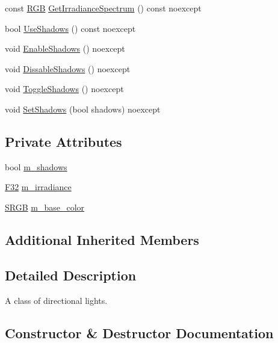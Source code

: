 \begin{DoxyCompactItemize}
\item 
const \hyperlink{structmage_1_1_r_g_b}{R\+GB} \hyperlink{classmage_1_1rendering_1_1_directional_light_a3a99d3d63a686f8bc587015115a85a81}{Get\+Irradiance\+Spectrum} () const noexcept
\item 
bool \hyperlink{classmage_1_1rendering_1_1_directional_light_a129904147256d111ec56cc3ddc502157}{Use\+Shadows} () const noexcept
\item 
void \hyperlink{classmage_1_1rendering_1_1_directional_light_abafdec9ce9ca0263724ce8ddba430b1b}{Enable\+Shadows} () noexcept
\item 
void \hyperlink{classmage_1_1rendering_1_1_directional_light_a7b0b25df35d2c1121bf08cb0a733b858}{Dissable\+Shadows} () noexcept
\item 
void \hyperlink{classmage_1_1rendering_1_1_directional_light_a34a939e192e857ac25f6d91dd773ec9b}{Toggle\+Shadows} () noexcept
\item 
void \hyperlink{classmage_1_1rendering_1_1_directional_light_a4a8aa135c9366993f6343b33cd4ed9e0}{Set\+Shadows} (bool shadows) noexcept
\end{DoxyCompactItemize}
\subsection*{Private Attributes}
\begin{DoxyCompactItemize}
\item 
bool \hyperlink{classmage_1_1rendering_1_1_directional_light_a64fa40ef9f9d0ae8a0856aabd44f0cae}{m\+\_\+shadows}
\item 
\hyperlink{namespacemage_aa97e833b45f06d60a0a9c4fc22ae02c0}{F32} \hyperlink{classmage_1_1rendering_1_1_directional_light_a72b58bf80a9f40934622aee9f68aa545}{m\+\_\+irradiance}
\item 
\hyperlink{structmage_1_1_s_r_g_b}{S\+R\+GB} \hyperlink{classmage_1_1rendering_1_1_directional_light_a1ef1bf05b2750b7de8f722db30a2398f}{m\+\_\+base\+\_\+color}
\end{DoxyCompactItemize}
\subsection*{Additional Inherited Members}


\subsection{Detailed Description}
A class of directional lights. 

\subsection{Constructor \& Destructor Documentation}
\hypertarget{classmage_1_1rendering_1_1_directional_light_a5a8c05a640ec86f4d1994d687de6415f}{}\label{classmage_1_1rendering_1_1_directional_light_a5a8c05a640ec86f4d1994d687de6415f} 
